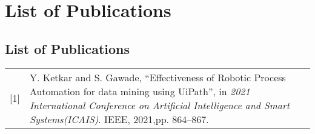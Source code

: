 \chapter*{List of Publications}
\thispagestyle{fancy}
\section*{\centering List of Publications}

\begin{table}[h]
    \centering
    \begin{tabular}{lp{417.25218pt}}
    [1] &
    Y. Ketkar and S. Gawade, ``Effectiveness of Robotic Process Automation for data mining using UiPath'', in \emph{2021 International Conference on Artificial Intelligence and Smart Systems(ICAIS)}. IEEE, 2021,pp. 864--867.
    \end{tabular}
\end{table}